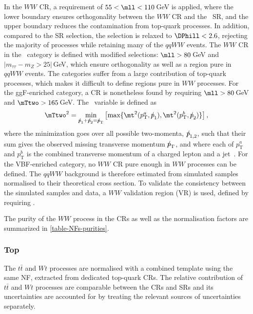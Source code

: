 In the \ZeroJet $WW$ CR, a requirement of $55 < \mll < 110$\,GeV is applied, where the lower boundary ensures orthogonality between the $WW$ CR and the \ZeroJet\ SR, and the upper boundary reduces the contamination from top-quark processes.
In addition, compared to the SR selection, the \DPhill selection is relaxed to $\DPhill < 2.6$, rejecting the majority of \Ztautau processes while retaining many of the $qqWW$ events.
The $WW$ CR in the \OneJet\ category is defined with modified selections: $\mll > 80\,$GeV and $|m_{\tau\tau} - m_Z > 25|\,$GeV, which ensure orthogonality as well as a region pure in $qqWW$ events.
The \TwoJet categories suffer from a large contribution of top-quark processes, which makes it difficult to define regions pure in $WW$ processes.
For the ggF-enriched \TwoJet category, a CR is nonetheless found by requiring $\mll > 80\,$GeV and $\mTtwo > 165\,$GeV. The \mTtwo\ variable is defined as
\begin{equation}
    \mTtwo^2 = \underset{{p\mkern-9.5mu/}_1+{p\mkern-9.5mu/}_2={p\mkern-9.5mu/}_\text{T}}{\textrm{min}} \left[\textrm{max}\{\mt^2(p_\text{T}^a,{p\mkern-9.5mu/}_1),\mt^2(p_\text{T}^b,{p\mkern-9.5mu/}_2)\}\right],
\end{equation}
where the minimization goes over all possible two-momenta, ${p\mkern-9.5mu/}_{1,2}$, such that their sum gives the observed missing transverse momentum ${p\mkern-9.5mu/}_\text{T}$, and where each of $p_\text{T}^a$ and $p_\text{T}^b$ is the combined transverse momentum of a charged lepton and a jet~\cite{PLACEHOLDER:PAPER:CITATION}.
For the VBF-enriched \TwoJet category, no $WW$ CR pure enough in $WW$ processes can be defined.
The $qqWW$ background is therefore estimated from simulated samples normalised to their theoretical cross section.
To validate the consistency between the simulated samples and data, a $WW$ validation region (VR) is used, defined by requiring .


The purity of the $WW$ process in the CRs as well as the normalisation factors are summarized in \cref{table-NFs-purities}.


\subsubsection{Top}
The $t\bar{t}$ and $Wt$ processes are normalised with a combined template using the same NF, extracted from dedicated top-quark CRs.
The relative contribution of $t\bar{t}$ and $Wt$ processes are comparable between the CRs and SRs and its uncertainties are accounted for by treating the relevant sources of uncertainties separately.

